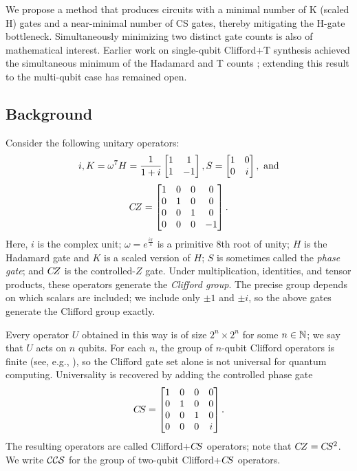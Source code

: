 \documentclass[reprint,amsmath,amssymb,aps,pra]{revtex4-2}
\begin{document}
We propose a method that produces circuits with a minimal number of K
(scaled H) gates and a near-minimal number of CS gates, thereby
mitigating the H-gate bottleneck. Simultaneously minimizing two
distinct gate counts is also of mathematical interest. Earlier work on
single-qubit Clifford+T synthesis achieved the simultaneous minimum of
the Hadamard and T counts \cite{matsumoto2008,kliuchnikov2013fast,
  giles2013remarks}; extending this result to the multi-qubit case has
remained open.


\subsection{Background}
Consider the following unitary operators:
\begin{equation*}\label{eqn-generators}
  i,
  K = \omega^{7} H = \frac{1}{1+i}\begin{bmatrix}1&1\\1&-1\end{bmatrix},
  S = \begin{bmatrix} 1&0\\0&i \end{bmatrix}, \text{ and}
\end{equation*}
\begin{equation*}
  C\kern-.16667em Z =  \begin{bmatrix} 1&0&0&0\\0&1&0&0\\0&0&1&0\\0&0&0&-1 \end{bmatrix}.
\end{equation*}
Here, $i$ is the complex unit; $\omega = e^{\frac{i\pi}{4}}$ is a
primitive 8th root of unity; $H$ is the Hadamard gate and $K$ is a
scaled version of $H$; $S$ is sometimes called the \emph{phase gate};
and $C\kern-.16667em Z$ is the controlled-$Z$ gate. Under multiplication,
identities, and tensor products, these operators generate the
\emph{Clifford group}. The precise group depends on which scalars are
included; we include only $\pm 1$ and $\pm i$, so the above gates
generate the Clifford group exactly.

Every operator $U$ obtained in this way is of size $2^n\times 2^n$ for
some $n \in {\mathbb N}$; we say that $U$ acts on $n$ qubits. For each $n$, the
group of $n$-qubit Clifford operators is finite (see, e.g.,
\cite{selinger2013generators}), so the Clifford gate set alone is not
universal for quantum computing. Universality is recovered by adding
the controlled phase gate
\begin{equation*}
  C\kern-.16667em S = \begin{bmatrix} 1&0&0&0\\0&1&0&0\\0&0&1&0\\0&0&0&i \end{bmatrix}.
\end{equation*}
The resulting operators are called Clifford+$C\kern-.16667em S$ operators; note that
$C\kern-.16667em Z = C\kern-.16667em S^2$. We write ${\mathcal{CCS}}$ for the group of two-qubit
Clifford+$C\kern-.16667em S$ operators.
\end{document}
